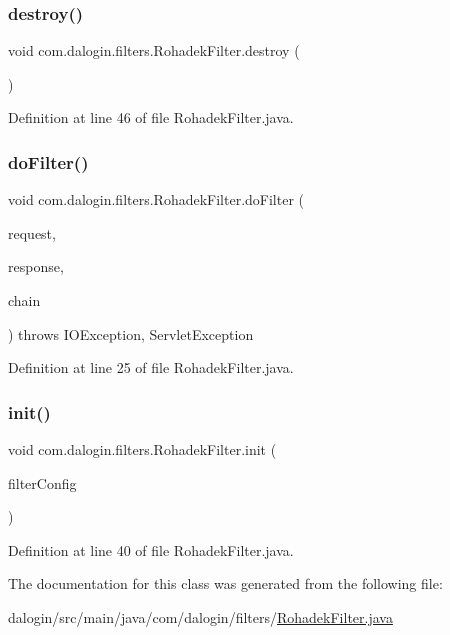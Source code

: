 \subsubsection{\texorpdfstring{destroy()}{destroy()}}
{\footnotesize\ttfamily void com.\+dalogin.\+filters.\+Rohadek\+Filter.\+destroy (\begin{DoxyParamCaption}{ }\end{DoxyParamCaption})}



Definition at line 46 of file Rohadek\+Filter.\+java.

\mbox{\label{classcom_1_1dalogin_1_1filters_1_1_rohadek_filter_a20e20c5eefa9d99e48b72dfb728a41a9}} 
\subsubsection{\texorpdfstring{do\+Filter()}{doFilter()}}
{\footnotesize\ttfamily void com.\+dalogin.\+filters.\+Rohadek\+Filter.\+do\+Filter (\begin{DoxyParamCaption}\item[{Servlet\+Request}]{request,  }\item[{Servlet\+Response}]{response,  }\item[{Filter\+Chain}]{chain }\end{DoxyParamCaption}) throws I\+O\+Exception, Servlet\+Exception}



Definition at line 25 of file Rohadek\+Filter.\+java.

\mbox{\label{classcom_1_1dalogin_1_1filters_1_1_rohadek_filter_a800e469b75fd8323acc7fb565914cb74}} 
\subsubsection{\texorpdfstring{init()}{init()}}
{\footnotesize\ttfamily void com.\+dalogin.\+filters.\+Rohadek\+Filter.\+init (\begin{DoxyParamCaption}\item[{Filter\+Config}]{filter\+Config }\end{DoxyParamCaption})}



Definition at line 40 of file Rohadek\+Filter.\+java.



The documentation for this class was generated from the following file\+:\begin{DoxyCompactItemize}
\item 
dalogin/src/main/java/com/dalogin/filters/\hyperlink{_rohadek_filter_8java}{Rohadek\+Filter.\+java}\end{DoxyCompactItemize}
